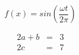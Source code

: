 \documentclass{jsarticle}
\begin{document}

\begin{equation}
f(x) = sin(\frac{\omega t}{2\pi})
\end{equation}

\begin{eqnarray}
  2a + b &=& 3 \\
  2c &=& 7
\end{eqnarray}
\end{document}
